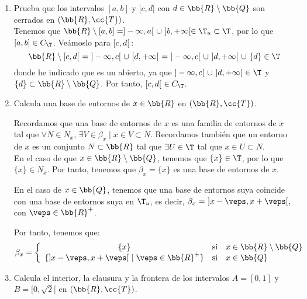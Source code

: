 \begin{ejercicio}
\begin{enumerate}[label=\alph*)]
        \item Prueba que los intervalos $[a,b]$ y $[c,d[$ con $d\in \bb{R}\setminus \bb{Q}$ son cerrados en $(\bb{R},\cc{T})$.\\

        Tenemos que $\bb{R}\setminus [a,b]=]-\infty, a[~\cup~]b,+\infty[\in \T_u\subset \T$, por lo que $[a,b]\in C_\T$. Veámoslo para $[c,d[~$:
        \begin{equation*}
            \bb{R}\setminus [c,d[ ~=~ ]-\infty,c[~\cup~[d,+\infty[~=~ 
            ]-\infty,c[~\cup~]d,+\infty[~\cup~\{d\}\in \T
        \end{equation*}
        donde he indicado que es un abierto, ya que $]-\infty,c[~\cup~]d,+\infty[~\in \T$ y $\{d\}\subset \bb{R}\setminus \bb{Q}$. Por tanto, $[c,d[~\in C_\T$.

        \item Calcula una base de entornos de $x\in \bb{R}$ en $(\bb{R},\cc{T})$.

        Recordamos que una base de entornos de $x$ es una familia de entornos de $x$ tal que $\forall N\in N_x$, $\exists V\in \beta_x\mid x\in V\subset N$. Recordamos también que un entorno de $x$ es un conjunto $N\subset \bb{R}$ tal que $\exists U\in \T$ tal que $x\in U\subset N$.\\

        En el caso de que $x\in \bb{R}\setminus \bb{Q}$, tenemos que $\{x\}\in \T$, por lo que $\{x\}\in N_x$. Por tanto, tenemos que $\beta_x=\{x\}$ es una base de entornos de $x$.

        En el caso de $x\in \bb{Q}$, tenemos que una base de entornos suya coincide con una base de entornos suya en $\T_u$, es decir, $\beta_x=~]x-\veps,x+\veps[,$ con $\veps\in \bb{R}^+$.

        Por tanto, tenemos que:
        \begin{equation*}
            \beta_x = \left\{\begin{array}{ccl}
                \{x\} & \text{si} & x\in \bb{R}\setminus \bb{Q}\\
                \{]x-\veps, x+\veps[~\mid \veps\in \bb{R}^+\}& \text{si} & x\in \bb{Q}
            \end{array}\right.
        \end{equation*}

        \item Calcula el interior, la clausura y la frontera de los intervalos $A=[0,1]$ y $B=[0,\sqrt{2}[$ en $(\bb{R},\cc{T})$.\\


\end{enumerate}
\end{ejercicio}
